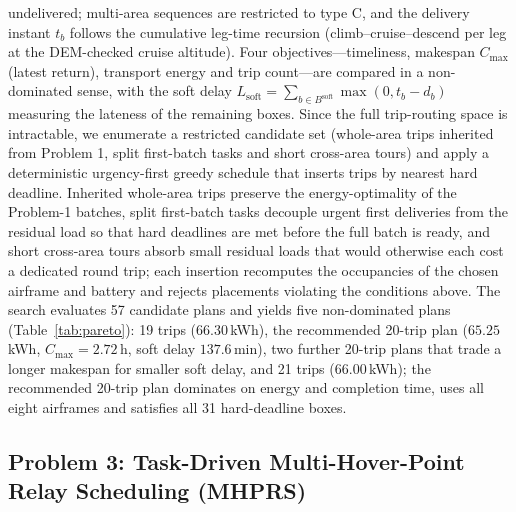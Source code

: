 \documentclass[journal]{IEEEtran}
\begin{document}
undelivered; multi-area sequences are restricted to type C, and the delivery
instant $t_b$ follows the cumulative leg-time recursion
(climb--cruise--descend per leg at the DEM-checked cruise altitude). Four
objectives---timeliness, makespan $C_{\max}$ (latest return), transport energy
and trip count---are compared in a non-dominated sense, with the soft delay
$L_{\mathrm{soft}}=\sum_{b\in B^{\mathrm{soft}}}\max(0,t_b-d_b)$ measuring the
lateness of the remaining boxes. Since the full trip-routing space is
intractable, we enumerate a restricted candidate set (whole-area trips inherited
from Problem 1, split first-batch tasks and short cross-area tours) and apply a
deterministic urgency-first greedy schedule that inserts trips by nearest hard
deadline. Inherited whole-area trips
preserve the energy-optimality of the Problem-1 batches, split first-batch tasks
decouple urgent first deliveries from the residual load so that hard deadlines
are met before the full batch is ready, and short cross-area tours absorb small
residual loads that would otherwise each cost a dedicated round trip; each
insertion recomputes the occupancies of the chosen airframe and battery and
rejects placements violating the conditions above. The search evaluates 57
candidate plans and yields five non-dominated plans (Table~\ref{tab:pareto}):
19 trips ($66.30$\,kWh), the recommended 20-trip plan ($65.25$\,kWh,
$C_{\max}=2.72$\,h, soft delay $137.6$\,min), two further 20-trip plans that
trade a longer makespan for smaller soft delay, and 21 trips ($66.00$\,kWh);
the recommended 20-trip plan
dominates on energy and completion time, uses all eight airframes and satisfies
all 31 hard-deadline boxes.

\subsection{Problem 3: Task-Driven Multi-Hover-Point Relay Scheduling (MHPRS)}
\label{sec:mhprs}
\end{document}
